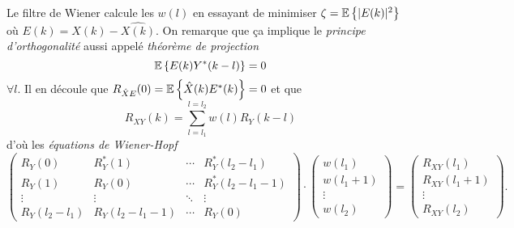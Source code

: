 Le filtre de Wiener calcule les $w(l)$ en essayant
de minimiser $\zeta = \mathbb{E}\left\{|E(k)|^2\right\}$
où $E(k) = X(k) - \hat{X(k)}$.
On remarque que ça implique
le \emph{principe d'orthogonalité} aussi appelé
\emph{théorème de projection}
\[ \mathbb{E}\left\{E(k)Y^*(k-l)\right\} = 0 \]
$\forall l$.
Il en découle que $R_{\hat{X}E}(0) = \mathbb{E}\left\{\hat{X}(k)E^*(k)\right\} = 0$
et que
\[ R_{XY}(k) = \sum_{l=l_1}^{l=l_2} w(l)R_Y(k-l) \]
d'où les \emph{équations de Wiener-Hopf}
\[
  \begin{pmatrix}
    R_Y(0) & R_Y^*(1) & \cdots & R_Y^*(l_2-l_1)\\
    R_Y(1) & R_Y(0) & \cdots & R_Y^*(l_2-l_1-1)\\
    \vdots & \vdots & \ddots & \vdots\\
    R_Y(l_2-l_1) & R_Y(l_2-l_1-1) & \cdots & R_Y(0)
  \end{pmatrix}
  \cdot
  \begin{pmatrix}
    w(l_1)\\w(l_1+1)\\\vdots\\w(l_2)
  \end{pmatrix}
  =
  \begin{pmatrix}
    R_{XY}(l_1)\\
    R_{XY}(l_1+1)\\
    \vdots\\
    R_{XY}(l_2)
  \end{pmatrix}.
\]


\annexe
